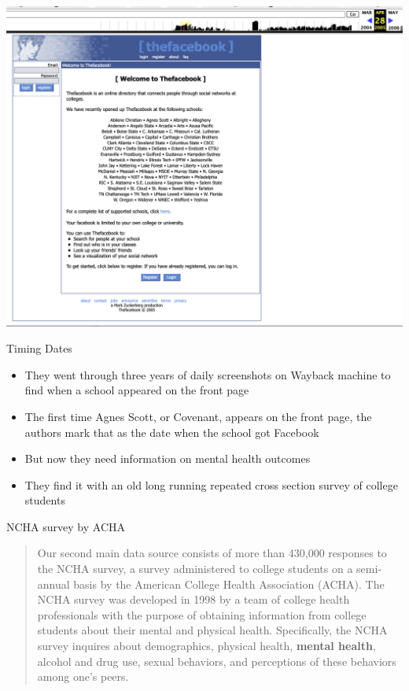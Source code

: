 \documentclass{beamer}
\begin{document}
\begin{frame}
\begin{center}
\includegraphics[scale=0.25]{./lecture_includes/wayback4}
\end{center}
\end{frame}

\begin{frame}{Timing Dates}

\begin{itemize}
\item They went through three years of daily screenshots on Wayback machine to find when a school appeared on the front page
\item The first time Agnes Scott, or Covenant, appears on the front page, the authors mark that as the date when the school got Facebook
\item But now they need information on mental health outcomes
\item They find it with an old long running repeated cross section survey of college students
\end{itemize}

\end{frame}

\begin{frame}{NCHA survey by ACHA}

\begin{quote}
Our second main data source consists of more than 430,000 responses to the NCHA survey, a survey administered to college students on a semi-annual basis by the American College Health Association (ACHA). The NCHA survey was developed in 1998 by a team of college health professionals with the purpose of obtaining information from college students about their mental and physical health. Specifically, the NCHA survey inquires about demographics, physical health, \textbf{mental health}, alcohol and drug use, sexual behaviors, and perceptions of these behaviors among one’s peers.
\end{quote}

\end{frame}
\end{document}
